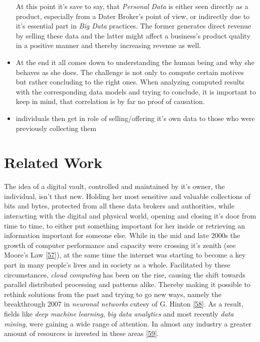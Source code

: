 \documentclass[12pt,english,a4paper,titlepage,cleardoublepage=empty,dottedtoc]{report}
\begin{document}
\begin{itemize}
  At this point it's save to say, that \emph{Personal Data} is either
  seen directly as a product, especially from a Dater Broker's point of
  view, or indirectly due to it's essential part in \emph{Big Data}
  practices. The former generates direct revenue by selling these data
  and the latter might affect a business's product quality in a positive
  manner and thereby increasing revenue as well.
\item
  At the end it all comes down to understanding the human being and why
  she behaves as she does. The challenge is not only to compute certain
  motives but rather concluding to the right ones. When analyzing
  computed results with the corresponding data models and trying to
  conclude, it is important to keep in mind, that correlation is by far
  no proof of causation.
\item
  individuals then get in role of selling/offering it's own data to
  those who were previously collecting them
\end{itemize}

\section{Related Work}\label{related-work}

The idea of a digital vault, controlled and maintained by it's owner,
the individual, isn't that new. Holding her most sensitive and valuable
collections of bits and bytes, protected from all these data brokers and
authorities, while interacting with the digital and physical world,
opening and closing it's door from time to time, to either put something
important for her inside or retrieving an information important for
someone else. While in the mid and late 2000s the growth of computer
performance and capacity were crossing it's zenith (see Moore's Law
{[}\protect\hyperlink{ref-paper_1965_moors-law}{57}{]}), at the same
time the internet was starting to become a key part in many people's
lives and in society as a whole. Facilitated by these circumstances,
\emph{cloud computing} has been on the rise, causing the shift towards
parallel distributed processing and patterns alike. Thereby making it
possible to rethink solutions from the past and trying to go new ways,
namely the breakthrough 2007 in \emph{neuronal networks} cutesy of G.
Hinton
{[}\protect\hyperlink{ref-podcast_2015_cre-neuronale-netze}{58}{]}. As a
result, fields like \emph{deep machine learning}, \emph{big data
analytics} and most recently \emph{data mining}, were gaining a wide
range of attention. In almost any industry a greater amount of resources
is invested in these areas
{[}\protect\hyperlink{ref-web_2016_industries-intention-to-invest-in-big-data}{59}{]}.
\end{document}

